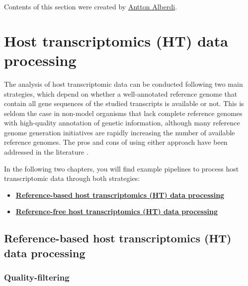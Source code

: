 \documentclass[
]{book}
\providecommand{\tightlist}{%
  \setlength{\itemsep}{0pt}\setlength{\parskip}{0pt}}
\begin{document}
\normalsize

Contents of this section were created by \protect\hyperlink{antton-alberdi}{Antton Alberdi}.

\hypertarget{host-transcriptomics-data-processing}{%
\chapter{Host transcriptomics (HT) data processing}\label{host-transcriptomics-data-processing}}

The analysis of host transcriptomic data can be conducted following two main strategies, which depend on whether a well-annotated reference genome that contain all gene sequences of the studied transcripts is available or not. This is seldom the case in non-model organisms that lack complete reference genomes with high-quality annotation of genetic information, although many reference genome generation initiatives are rapidly increasing the number of available reference genomes. The pros and cons of using either approach have been addressed in the literature \citep{Lee2021-th}.

In the following two chapters, you will find example pipelines to process host transcriptomic data through both strategies:

\begin{itemize}
\tightlist
\item
  \textbf{\protect\hyperlink{host-transcriptomics-data-processing-reference-based}{Reference-based host transcriptomics (HT) data processing}}
\item
  \textbf{\protect\hyperlink{host-transcriptomics-data-processing-reference-free}{Reference-free host transcriptomics (HT) data processing}}
\end{itemize}

\hypertarget{host-transcriptomics-data-processing-reference-based}{%
\section{Reference-based host transcriptomics (HT) data processing}\label{host-transcriptomics-data-processing-reference-based}}

\hypertarget{quality-filtering}{%
\subsection*{Quality-filtering}\label{quality-filtering}}
\end{document}
